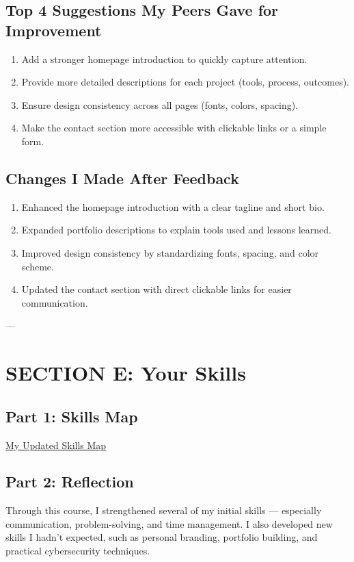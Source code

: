 \documentclass[12pt,a4paper]{article}
\begin{document}
\subsection*{Top 4 Suggestions My Peers Gave for Improvement}
\begin{enumerate}
    \item Add a stronger homepage introduction to quickly capture attention.
    \item Provide more detailed descriptions for each project (tools, process, outcomes).
    \item Ensure design consistency across all pages (fonts, colors, spacing).
    \item Make the contact section more accessible with clickable links or a simple form.
\end{enumerate}

\subsection*{Changes I Made After Feedback}
\begin{enumerate}
    \item Enhanced the homepage introduction with a clear tagline and short bio.
    \item Expanded portfolio descriptions to explain tools used and lessons learned.
    \item Improved design consistency by standardizing fonts, spacing, and color scheme.
    \item Updated the contact section with direct clickable links for easier communication.
\end{enumerate}

---

\section*{SECTION E: Your Skills}

\subsection*{Part 1: Skills Map}
\href{https://docs.google.com/spreadsheets/d/11I4psjQQPlH0mAMf97CslEBP5pNX6FJ0gSnHmt1YgX4/edit?gid=204951133\#gid=204951133}{My Updated Skills Map}

\subsection*{Part 2: Reflection}
Through this course, I strengthened several of my initial skills — especially communication, problem-solving, and time management. I also developed new skills I hadn’t expected, such as personal branding, portfolio building, and practical cybersecurity techniques.  
\end{document}
